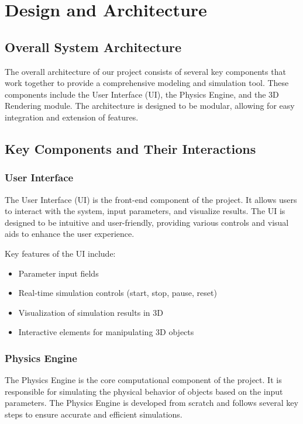 
\chapter{Design and Architecture}

\section{Overall System Architecture}

The overall architecture of our project consists of several key components that work together to provide a comprehensive modeling and simulation tool. These components include the User Interface (UI), the Physics Engine, and the 3D Rendering module. The architecture is designed to be modular, allowing for easy integration and extension of features.


\section{Key Components and Their Interactions}

\subsection{User Interface}

The User Interface (UI) is the front-end component of the project. It allows users to interact with the system, input parameters, and visualize results. The UI is designed to be intuitive and user-friendly, providing various controls and visual aids to enhance the user experience.

Key features of the UI include:
\begin{itemize}
    \item Parameter input fields
    \item Real-time simulation controls (start, stop, pause, reset)
    \item Visualization of simulation results in 3D
    \item Interactive elements for manipulating 3D objects
\end{itemize}

\subsection{Physics Engine}

The Physics Engine is the core computational component of the project. It is responsible for simulating the physical behavior of objects based on the input parameters. The Physics Engine is developed from scratch and follows several key steps to ensure accurate and efficient simulations.

